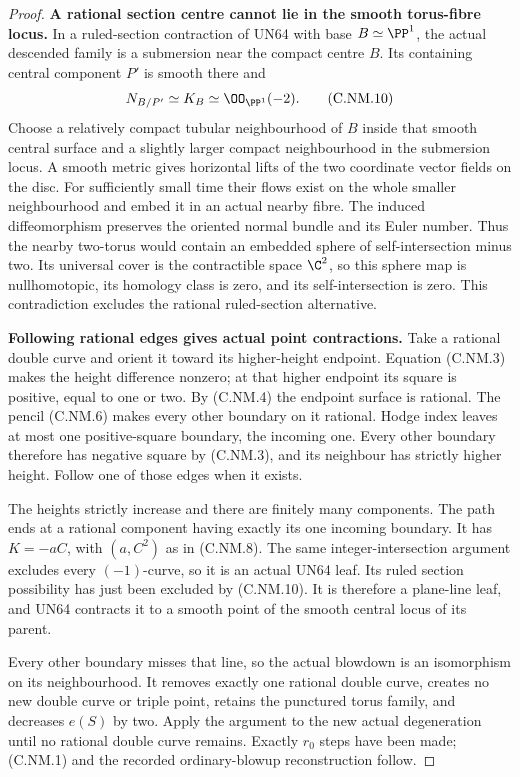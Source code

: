 \begin{proof}
\par\medskip\noindent\textbf{A rational section centre cannot lie in the smooth torus-fibre locus.}
In a ruled-section contraction of UN64 with base
$B\simeq\PP^1$, the actual descended family is a
submersion near the compact centre $B$. Its containing
central component $P'$ is smooth there and
\[
                    N_{B/P'}\simeq K_B\simeq\OO_{\PP^1}(-2).
\tag{C.NM.10}
\]
Choose a relatively compact tubular neighbourhood of
$B$ inside that smooth central surface and a slightly
larger compact neighbourhood in the submersion locus.
A smooth metric gives horizontal lifts of the two
coordinate vector fields on the disc. For sufficiently
small time their flows exist on the whole smaller
neighbourhood and embed it in an actual nearby fibre.
The induced diffeomorphism preserves the oriented
normal bundle and its Euler number. Thus the nearby
two-torus would contain an embedded sphere of
self-intersection minus two. Its universal cover is
the contractible space $\C^2$, so this sphere map is
nullhomotopic, its homology class is zero, and its
self-intersection is zero. This contradiction excludes
the rational ruled-section alternative.

\par\medskip\noindent\textbf{Following rational edges gives actual point contractions.}
Take a rational double curve and orient it toward its
higher-height endpoint. Equation (C.NM.3) makes the
height difference nonzero; at that higher endpoint
its square is positive, equal to one or two. By
(C.NM.4) the endpoint surface is rational. The pencil
(C.NM.6) makes every other boundary on it rational.
Hodge index leaves at most one positive-square
boundary, the incoming one. Every other boundary
therefore has negative square by (C.NM.3), and its
neighbour has strictly higher height. Follow one
of those edges when it exists.

The heights strictly increase and there are finitely
many components. The path ends at a rational
component having exactly its one incoming boundary.
It has $K=-aC$, with $(a,C^2)$ as in (C.NM.8).
The same integer-intersection argument excludes every
$(-1)$-curve, so it is an actual UN64 leaf. Its ruled
section possibility has just been excluded by
(C.NM.10). It is therefore a plane-line leaf, and
UN64 contracts it to a smooth point of the smooth
central locus of its parent.

Every other boundary misses that line, so the actual
blowdown is an isomorphism on its neighbourhood.
It removes exactly one rational double curve, creates
no new double curve or triple point, retains the
punctured torus family, and decreases $e(S)$ by two.
Apply the argument to the new actual degeneration
until no rational double curve remains. Exactly
$r_0$ steps have been made; (C.NM.1) and the recorded
ordinary-blowup reconstruction follow.
\end{proof}
